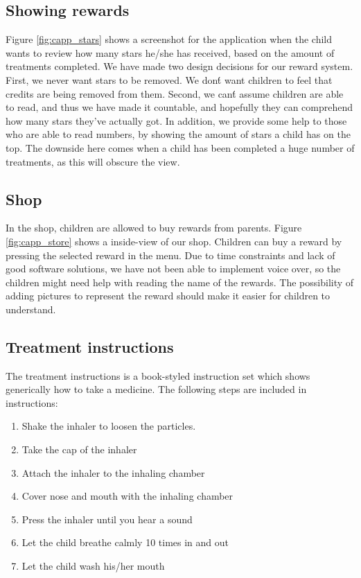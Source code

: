 \subsection{Showing rewards}
\label{sec:description-show-rewards}
Figure \ref{fig:capp_stars} shows a screenshot for the application when the child wants to review how many stars he/she has received, based on the amount of treatments completed. We have made two design decisions for our reward system. First, we never want stars to be removed. We don\'t want children to feel that credits are being removed from them. Second, we can\'t assume children are able to read, and thus we have made it countable, and hopefully they can comprehend how many stars they've actually got. In addition, we provide some help to those who are able to read numbers, by showing the amount of stars a child has on the top. The downside here comes when a child has been completed a huge number of treatments, as this will obscure the view.     

\subsection{Shop}
\label{sec:description-shop}
In the shop, children are allowed to buy rewards from parents. Figure \ref{fig:capp_store} shows a inside-view of our shop. Children can buy a reward by pressing the selected reward in the menu. Due to time constraints and lack of good software solutions, we have not been able to implement voice over, so the children might need help with reading the name of the rewards. The possibility of adding pictures to represent the reward should make it easier for children to understand. 



\subsection{Treatment instructions}
\label{sec:description-instructions}
The treatment instructions is a book-styled instruction set which shows generically how to take a medicine. 
The following steps are included in instructions: 
\begin{enumerate}
  \item Shake the inhaler to loosen the particles. 
  \item Take the cap of the inhaler
  \item Attach the inhaler to the inhaling chamber
  \item Cover nose and mouth with the inhaling chamber
  \item Press the inhaler until you hear a sound
  \item Let the child breathe calmly 10 times in and out
  \item Let the child wash his/her mouth
\end{enumerate} 



